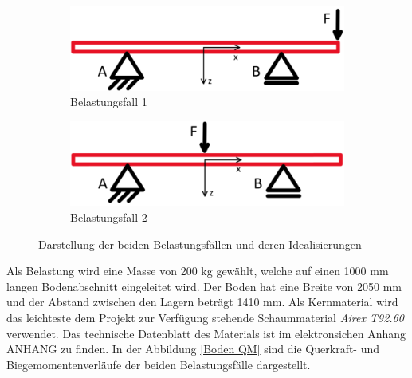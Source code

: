 \begin{figure}[!ht]
  \centering
    \begin{subfigure}{.5\textwidth}
      \centering
      \includegraphics[width=.8\linewidth]{04_figures/Boden Fall1.png}
      \caption{Belastungsfall 1}
      \label{Belastungsfall 1}
    \end{subfigure}%
    \begin{subfigure}{.5\textwidth}
      \centering
      \includegraphics[width=.8\linewidth]{04_figures/Boden Fall2.png}
      \caption{Belastungsfall 2}
      \label{Belastungsfall 2}
    \end{subfigure}%
  \caption{Darstellung der beiden Belastungsfällen und deren Idealisierungen}
\label{Boden Idealisierung}
\end{figure}

Als Belastung wird eine Masse von 200 kg gewählt, welche auf einen 1000 mm langen Bodenabschnitt eingeleitet wird. Der Boden hat eine Breite von 2050 mm und der Abstand zwischen den Lagern beträgt 1410 mm. Als Kernmaterial wird das leichteste dem Projekt zur Verfügung stehende Schaummaterial \emph{Airex T92.60} verwendet. Das technische Datenblatt des Materials ist im elektronsichen Anhang ANHANG zu finden. In der Abbildung \ref{Boden QM} sind die Querkraft- und Biegemomentenverläufe der beiden Belastungsfälle dargestellt.

